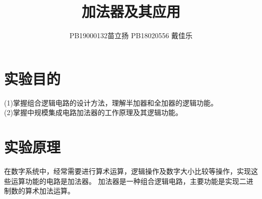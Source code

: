 \documentclass[a4paper,11pt,UTF8]{ctexart}
\title{加法器及其应用}
\author{PB19000132苗立扬  PB18020556 戴佳乐}
\begin{document}
\maketitle


%
\newcommand{\p}{\par}
\newcommand{\np}{\par\noindent}
%
\newcommand{\expa}{用一片74LS283实现并行四位全加，将A置为1001，B置为0000\~{}1001，
依次计算A+B并记录结果表列。}
\newcommand{\expb}{用两片74LS283和必要的门电路实现两个8421BCD码求和运算，结果
仍为8421BCD码，要求画出逻辑功能图。}
\newcommand{\expc}{用两片74LS283和必要的门电路实现一个带借位输入和借位输出的
8421BCD码减法器，要求电路输出为原码}
\newcommand{\expd}{用双4选1数据选择器74LS153实现一位全加器}
\newcommand{\chip}{数据选择器74LS151}

\newcommand{\CI}{C\negthinspace I}
\newcommand{\CO}{C\negthinspace O}
%

\section{实验目的}

(1)掌握组合逻辑电路的设计方法，理解半加器和全加器的逻辑功能。\\
(2)掌握中规模集成电路加法器的工作原理及其逻辑功能。\\


\section{实验原理}

在数字系统中，经常需要进行算术运算，逻辑操作及数字大小比较等操作，实现这些运算功能的电路是加法器。
加法器是一种组合逻辑电路，主要功能是实现二进制数的算术加法运算。
\\
\end{document}
